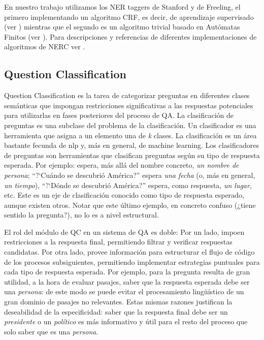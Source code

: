 En nuestro trabajo utilizamos los NER taggers de Stanford\cite{NER2} y de Freeling, el primero implementando un algoritmo CRF, es decir, de aprendizaje supervisado (ver ) mientras que el segundo es un algoritmo trivial basado en Autómatas Finitos (ver ). Para descripciones y referencias de diferentes implementaciones de algoritmos de NERC ver \cite{NER1}.


\subsection{Question Classification}
\label{subsec:qc}
Question Classification es la tarea de categorizar preguntas en diferentes 
clases semánticas que impongan restricciones significativas a las respuestas potenciales 
para utilizarlas en fases posteriores del proceso de QA.
La clasificación de preguntas es una subclase del problema de la clasificación. 
Un clasificador es una herramienta que asigna a un elemento una de
\textit{k} clases. La clasificación es un área bastante fecunda de nlp y, más en general, de machine learning. 
Los clasificadores de preguntas son herramientas que clasifican preguntas según su tipo de respuesta esperada. Por ejemplo:
 espera, más allá del nombre concreto, \textit{un nombre de persona}; {\textquotedblleft}?`Cuándo se descubrió
América?{\textquotedblright} espera \textit{una fecha} (o, más en
general, \textit{un tiempo}), {\textquotedblleft}?`Dónde se
descubrió América?{\textquotedblright} espera, como respuesta,
\textit{un lugar}, etc. Este es un eje de clasificación conocido como
tipo de respuesta esperado, aunque existen otros. Notar que este último ejemplo, en concreto confuso (¿tiene sentido la pregunta?), no lo es a nivel estructural.

El rol del módulo de QC en un sistema de QA es doble: Por un lado, impoen restricciones a la respuesta final, permitiendo filtrar y verificar respuestas candidatas.
Por otra lado, provee información para estructurar el flujo de código de los procesos subsiguientes, permitiendo implementar estrategias puntuales para cada tipo de respuesta esperada. Por ejemplo, para la pregunta  resulta de gran utilidad, a la hora de evaluar pasajes, saber que la respuesta esperada debe ser una \textit{persona}: de este modo se puede evitar el procesamiento lingüístico de un gran dominio de pasajes no relevantes. Estas mismas razones justifican la deseabilidad de la especificidad: saber que la respuesta final debe ser un \textit{presidente} o un \textit{político} es más informativo y útil para el resto del proceso que solo saber que es una \textit{persona}.

